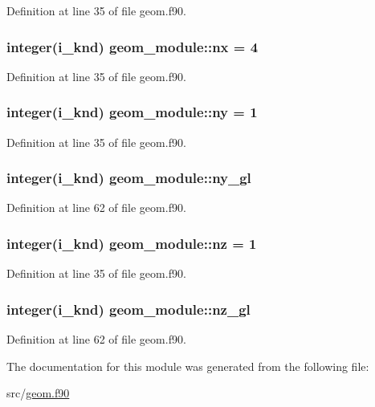 Definition at line 35 of file geom.\-f90.

\hypertarget{classgeom__module_a7a5902416f1d33e2a27620d6c82db061}{
\subsubsection[{nx}]{\setlength{\rightskip}{0pt plus 5cm}integer(i\-\_\-knd) geom\-\_\-module\-::nx = 4}}\label{classgeom__module_a7a5902416f1d33e2a27620d6c82db061}


Definition at line 35 of file geom.\-f90.

\hypertarget{classgeom__module_a38b87580d41ec11b8719f65f06b8b0a3}{
\subsubsection[{ny}]{\setlength{\rightskip}{0pt plus 5cm}integer(i\-\_\-knd) geom\-\_\-module\-::ny = 1}}\label{classgeom__module_a38b87580d41ec11b8719f65f06b8b0a3}


Definition at line 35 of file geom.\-f90.

\hypertarget{classgeom__module_a28abec0d4fe709bc64ee36b68347ce1a}{
\subsubsection[{ny\-\_\-gl}]{\setlength{\rightskip}{0pt plus 5cm}integer(i\-\_\-knd) geom\-\_\-module\-::ny\-\_\-gl}}\label{classgeom__module_a28abec0d4fe709bc64ee36b68347ce1a}


Definition at line 62 of file geom.\-f90.

\hypertarget{classgeom__module_a5f461a2f10c78de302a44c8c70b8fca5}{
\subsubsection[{nz}]{\setlength{\rightskip}{0pt plus 5cm}integer(i\-\_\-knd) geom\-\_\-module\-::nz = 1}}\label{classgeom__module_a5f461a2f10c78de302a44c8c70b8fca5}


Definition at line 35 of file geom.\-f90.

\hypertarget{classgeom__module_a3d237cf21a21064504566ce34b27c848}{
\subsubsection[{nz\-\_\-gl}]{\setlength{\rightskip}{0pt plus 5cm}integer(i\-\_\-knd) geom\-\_\-module\-::nz\-\_\-gl}}\label{classgeom__module_a3d237cf21a21064504566ce34b27c848}


Definition at line 62 of file geom.\-f90.



The documentation for this module was generated from the following file\-:\begin{DoxyCompactItemize}
\item 
src/\hyperlink{geom_8f90}{geom.\-f90}\end{DoxyCompactItemize}
